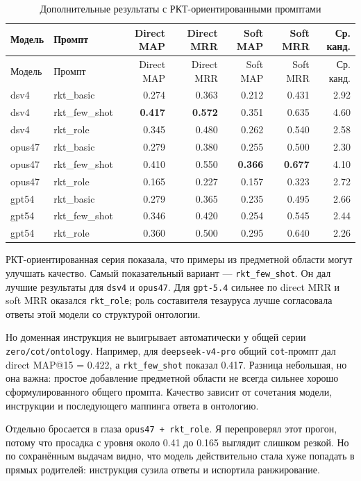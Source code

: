 \documentclass[12pt,a4paper,oneside,openany]{report}
\begin{document}
{\scriptsize
\setlength{\tabcolsep}{3pt}
\begin{longtable}{p{20mm}p{26mm}rrrrr}
\caption{Дополнительные результаты с РКТ-ориентированными промптами}\\
\toprule
Модель & Промпт & Direct MAP & Direct MRR & Soft MAP & Soft MRR & Ср. канд. \\
\midrule
\endfirsthead
\toprule
Модель & Промпт & Direct MAP & Direct MRR & Soft MAP & Soft MRR & Ср. канд. \\
\midrule
\endhead
dsv4 & rkt\_basic & 0.274 & 0.363 & 0.212 & 0.431 & 2.92 \\
dsv4 & rkt\_few\_shot & \textbf{0.417} & \textbf{0.572} & 0.351 & 0.635 & 4.60 \\
dsv4 & rkt\_role & 0.345 & 0.480 & 0.262 & 0.540 & 2.58 \\
opus47 & rkt\_basic & 0.279 & 0.380 & 0.255 & 0.500 & 2.30 \\
opus47 & rkt\_few\_shot & 0.410 & 0.550 & \textbf{0.366} & \textbf{0.677} & 4.10 \\
opus47 & rkt\_role & 0.165 & 0.227 & 0.157 & 0.323 & 2.72 \\
gpt54 & rkt\_basic & 0.279 & 0.365 & 0.235 & 0.495 & 2.66 \\
gpt54 & rkt\_few\_shot & 0.346 & 0.420 & 0.254 & 0.545 & 2.44 \\
gpt54 & rkt\_role & 0.360 & 0.500 & 0.295 & 0.640 & 2.26 \\
\bottomrule
\end{longtable}
}

РКТ-ориентированная серия показала, что примеры из предметной области могут улучшать качество. Самый показательный вариант — \texttt{rkt\_few\_shot}. Он дал лучшие результаты для \texttt{dsv4} и \texttt{opus47}. Для \texttt{gpt-5.4} сильнее по direct MRR и soft MRR оказался \texttt{rkt\_role}; роль составителя тезауруса лучше согласовала ответы этой модели со структурой онтологии.

Но доменная инструкция не выигрывает автоматически у общей серии \texttt{zero/cot/ontology}. Например, для \texttt{deepseek-v4-pro} общий \texttt{cot}-промпт дал direct MAP@15 = 0.422, а \texttt{rkt\_few\_shot} показал 0.417. Разница небольшая, но она важна: простое добавление предметной области не всегда сильнее хорошо сформулированного общего промпта. Качество зависит от сочетания модели, инструкции и последующего маппинга ответа в онтологию.

Отдельно бросается в глаза \texttt{opus47 + rkt\_role}. Я перепроверял этот прогон, потому что просадка с уровня около 0.41 до 0.165 выглядит слишком резкой. Но по сохранённым выдачам видно, что модель действительно стала хуже попадать в прямых родителей: инструкция сузила ответы и испортила ранжирование.
\end{document}

